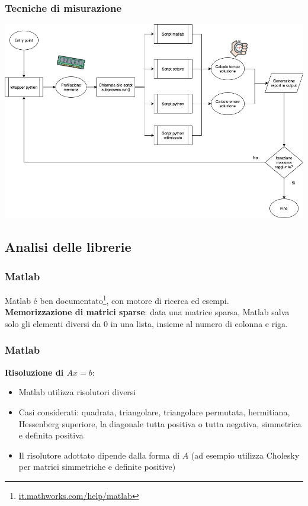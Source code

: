 \documentclass{beamer}
\begin{document}
\begin{frame}

	\frametitle{Tecniche di misurazione}

	\includegraphics[height=0.6\textwidth]{assets/execution_workflow.png}

\end{frame}

\subsection{Analisi delle librerie}

\begin{frame}
	\frametitle{Matlab}
	Matlab \'e ben documentato\footnote{\url{it.mathworks.com/help/matlab}}, con motore di ricerca ed esempi.\\
		\textbf{Memorizzazione di matrici sparse}: data una matrice sparsa, Matlab salva solo gli elementi diversi da 0 in una lista, insieme al numero di colonna e riga.
	\end{frame}


\begin{frame}
\frametitle{Matlab}
\textbf{Risoluzione di $Ax = b$}:

\begin{itemize}
	\item Matlab utilizza risolutori diversi
	\item Casi considerati: quadrata, triangolare, triangolare permutata, hermitiana, Hessenberg superiore, la diagonale tutta positiva o tutta negativa, simmetrica e definita positiva
	\item Il risolutore adottato dipende dalla forma di $A$ (ad esempio utilizza Cholesky per matrici simmetriche e definite positive)
\end{itemize}
\end{frame}
\end{document}
